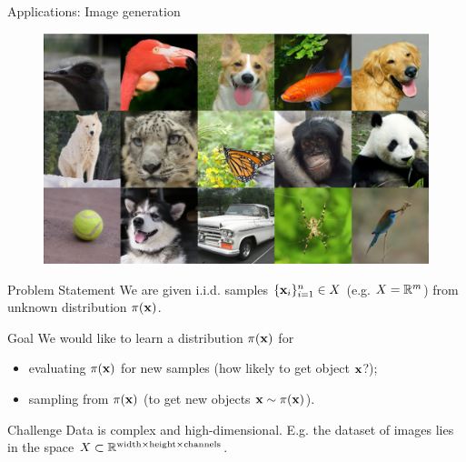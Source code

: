 \begin{frame}{Applications: Image generation}
	\begin{figure}
		\includegraphics[width=\linewidth]{figs/diffusion_models}
	\end{figure}
\end{frame}
\begin{frame}{Problem Statement}
We are given i.i.d. samples $\{\mathbf{x}_i\}_{i=1}^n \in X$ (e.g. $X = \mathbb{R}^m$) from unknown distribution $\pi(\mathbf{x})$.

\begin{block}{Goal}
	We would like to learn a distribution $\pi(\mathbf{x})$ for 
	\begin{itemize}
	    \item evaluating $\pi(\mathbf{x})$ for new samples (how likely to get object $\mathbf{x}$?);
	    \item sampling from $\pi(\mathbf{x})$ (to get new objects $\mathbf{x} \sim \pi(\mathbf{x})$).
	\end{itemize}
\end{block}
\begin{block}{Challenge}
	 Data is complex and high-dimensional. E.g. the dataset of images lies in the space $X \subset \mathbb{R}^{\text{width} \times \text{height} \times \text{channels}}$.
\end{block}
\end{frame}
